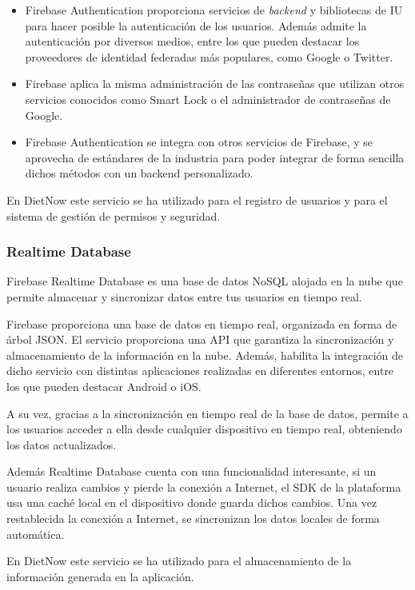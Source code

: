 \begin{itemize}
    \item  Firebase Authentication \cite{firebase_auth} proporciona servicios de \textit{backend} y bibliotecas de IU para hacer posible la autenticación de los usuarios. Además admite la autenticación por diversos medios, entre los que pueden destacar los proveedores de identidad federadas más populares, como Google o Twitter.
    \item Firebase aplica la misma administración de las contraseñas que utilizan otros servicios conocidos como Smart Lock o el administrador de contraseñas de Google.
    \item Firebase Authentication se integra con otros servicios de Firebase, y se aprovecha de estándares de la industria para poder integrar de forma sencilla dichos métodos con un backend personalizado.
\end{itemize}

En DietNow este servicio se ha utilizado para el registro de usuarios y para el sistema de gestión de permisos y seguridad.


\subsubsection{Realtime Database}
Firebase Realtime Database \cite{firebase_realtime_database} es una base de datos NoSQL alojada en la nube que permite almacenar y sincronizar datos entre tus usuarios en tiempo real.

Firebase proporciona una base de datos en tiempo real, organizada en forma de árbol JSON. El servicio proporciona una API que garantiza la sincronización y almacenamiento de la información en la nube. Además, habilita la integración de dicho servicio con distintas aplicaciones realizadas en diferentes entornos, entre los que pueden destacar Android o iOS.

A su vez, gracias a la sincronización en tiempo real de la base de datos, permite a los usuarios acceder a ella desde cualquier dispositivo en tiempo real, obteniendo los datos actualizados.

Además Realtime Database cuenta con una funcionalidad interesante, si un usuario realiza cambios y pierde la conexión a Internet, el SDK de la plataforma usa una caché local en el dispositivo donde guarda dichos cambios. Una vez restablecida la conexión a Internet, se sincronizan los datos locales de forma automática.

En DietNow este servicio se ha utilizado para el almacenamiento de la información generada en la aplicación.



